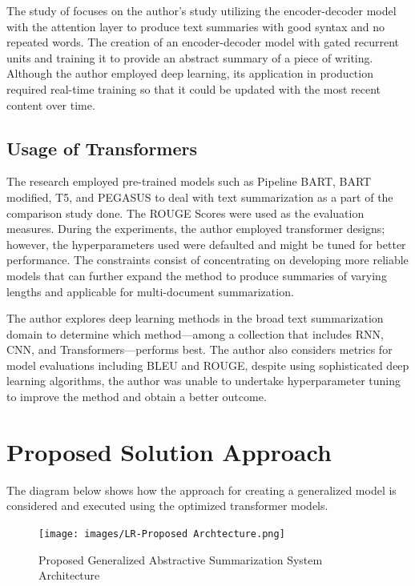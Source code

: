 \documentclass[conference]{IEEEtran}
\begin{document}
The study of \cite{etemad_abidi_chhabra_2021} focuses on the author's study utilizing the encoder-decoder model with the attention layer to produce text summaries with good syntax and no repeated words. The creation of an encoder-decoder model with gated recurrent units and training it to provide an abstract summary of a piece of writing. Although the author employed deep learning, its application in production required real-time training so that it could be updated with the most recent content over time.

\subsection{Usage of Transformers}
\cite{gupta_lehal_2010} The research employed pre-trained models such as Pipeline BART, BART modified, T5, and PEGASUS to deal with text summarization as a part of the comparison study done. The ROUGE Scores were used as the evaluation measures. During the experiments, the author employed transformer designs; however, the hyperparameters used were defaulted and might be tuned for better performance. The constraints consist of concentrating on developing more reliable models that can further expand the method to produce summaries of varying lengths and applicable for multi-document summarization.

\cite{etemad_abidi_chhabra_2021} The author explores deep learning methods in the broad text summarization domain to determine which method—among a collection that includes RNN, CNN, and Transformers—performs best. The author also considers metrics for model evaluations including BLEU and ROUGE, despite using sophisticated deep learning algorithms, the author was unable to undertake hyperparameter tuning to improve the method and obtain a better outcome.

\section{Proposed Solution Approach}
The diagram below shows how the approach for creating a generalized model is considered and executed using the optimized transformer models.

\begin{figure}[htbp]
\centerline{\texttt{[image: images/LR-Proposed Archtecture.png]}}
\caption{Proposed Generalized Abstractive Summarization System Architecture}
\label{fig:trait-content-output}
\end{figure}
\end{document}
